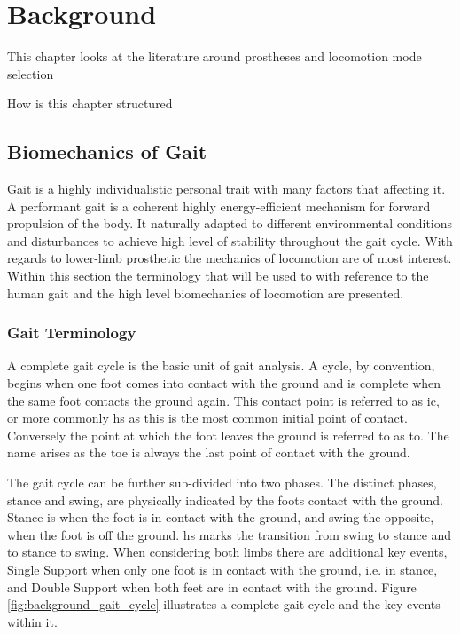\chapter{Background}
\label{chp:background}
This chapter looks at the literature around prostheses and locomotion mode selection 

How is this chapter structured



\section{Biomechanics of Gait}
Gait is a highly individualistic personal trait with many factors that affecting it\cite{Horst2019}. A performant gait is a coherent highly energy-efficient mechanism for forward propulsion of the body. It naturally adapted to different environmental conditions and disturbances to achieve high level of stability throughout the gait cycle\cite{Shah2020, Mummolo2013}. With regards to lower-limb prosthetic the mechanics of locomotion are of most interest. Within this section the terminology that will be used to with reference to the human gait and the high level biomechanics of locomotion are presented.

\subsection{Gait Terminology}
A complete gait cycle is the basic unit of gait analysis. A cycle, by convention, begins when one foot comes into contact with the ground and is complete when the same foot contacts the ground again. This contact point is referred to as \acrfull{ic}, or more commonly \acrfull{hs} as this is the most common initial point of contact. Conversely the point at which the foot leaves the ground is referred to as \acrfull{to}. The name arises as the toe is always the last point of contact with the ground.\cite{Novacheck1998, Shah2020}

The gait cycle can be further sub-divided into two phases. The distinct phases, stance and swing, are physically indicated by the foots contact with the ground. Stance is when the foot is in contact with the ground, and swing the opposite, when the foot is off the ground. \acrshort{hs} marks the transition from swing to stance and \acrshort{to} stance to swing. When considering both limbs there are additional key events, Single Support when only one foot is in contact with the ground, i.e. in stance, and Double Support when both feet are in contact with the ground. Figure \ref{fig:background_gait_cycle} illustrates a complete gait cycle and the key events within it.\cite{Novacheck1998, Shah2020}

